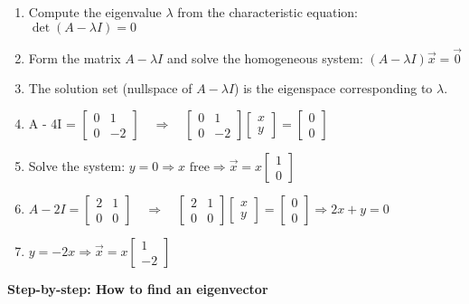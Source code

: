 \documentclass{article}
\begin{document}
\begin{multicols*}{2}
\begin{enumerate}
  \item Compute the eigenvalue $\lambda$ from the characteristic equation: $\det(A - \lambda I) = 0$
  \item Form the matrix $A - \lambda I$ and solve the homogeneous system:
  $(A - \lambda I)\vec{x} = \vec{0}$
  \item The solution set (nullspace of $A - \lambda I$) is the eigenspace corresponding to $\lambda$.
  \item A - 4I = $\begin{bmatrix} 0 & 1 \\ 0 & -2 \end{bmatrix}\quad \Rightarrow \quad \begin{bmatrix} 0 & 1 \\ 0 & -2 \end{bmatrix}\begin{bmatrix} x \\ y \end{bmatrix}= \begin{bmatrix} 0 \\ 0 \end{bmatrix}$
  \item Solve the system: $y = 0 \Rightarrow x \text{ free} \Rightarrow \vec{x} = x\begin{bmatrix} 1 \\ 0 \end{bmatrix}$
  \item $A - 2I = \begin{bmatrix} 2 & 1 \\ 0 & 0 \end{bmatrix}\quad \Rightarrow \quad\begin{bmatrix} 2 & 1 \\ 0 & 0 \end{bmatrix}\begin{bmatrix} x \\ y \end{bmatrix}= \begin{bmatrix} 0 \\ 0 \end{bmatrix}\Rightarrow 2x + y = 0$
  \item $y = -2x \Rightarrow \vec{x} = x\begin{bmatrix} 1 \\ -2 \end{bmatrix}$
\end{enumerate}
\textbf{Step-by-step: How to find an eigenvector}
\begin{enumerate}

\end{enumerate}
\end{multicols*}
\end{document}
